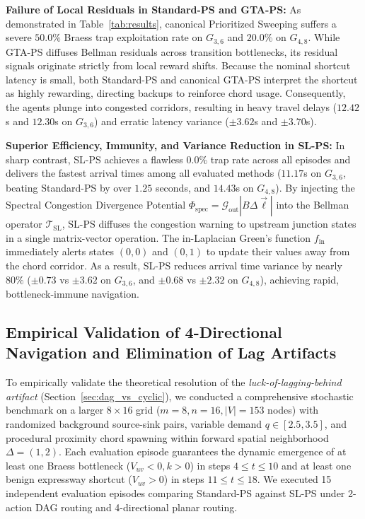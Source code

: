 \documentclass[11pt,a4paper]{article}
\begin{document}
\textbf{Failure of Local Residuals in Standard-PS and GTA-PS:}
As demonstrated in Table~\ref{tab:results}, canonical Prioritized Sweeping suffers a severe $50.0\%$ Braess trap exploitation rate on $G_{3,6}$ and $20.0\%$ on $G_{4,8}$. While GTA-PS diffuses Bellman residuals across transition bottlenecks, its residual signals originate strictly from local reward shifts. Because the nominal shortcut latency is small, both Standard-PS and canonical GTA-PS interpret the shortcut as highly rewarding, directing backups to reinforce chord usage. Consequently, the agents plunge into congested corridors, resulting in heavy travel delays ($12.42$s and $12.30$s on $G_{3,6}$) and erratic latency variance ($\pm 3.62$s and $\pm 3.70$s).

\textbf{Superior Efficiency, Immunity, and Variance Reduction in SL-PS:}
In sharp contrast, SL-PS achieves a flawless $0.0\%$ trap rate across all episodes and delivers the fastest arrival times among all evaluated methods ($11.17$s on $G_{3,6}$, beating Standard-PS by over $1.25$ seconds, and $14.43$s on $G_{4,8}$). By injecting the Spectral Congestion Divergence Potential $\Phi_{\text{spec}} = \mathcal{G}_{\text{out}} |B \Delta \vec{\ell}|$ into the Bellman operator $\mathcal{T}_{\text{SL}}$, SL-PS diffuses the congestion warning to upstream junction states in a single matrix-vector operation. The in-Laplacian Green's function $f_{\text{in}}$ immediately alerts states $(0, 0)$ and $(0, 1)$ to update their values away from the chord corridor. As a result, SL-PS reduces arrival time variance by nearly $80\%$ ($\pm 0.73$ vs $\pm 3.62$ on $G_{3,6}$, and $\pm 0.68$ vs $\pm 2.32$ on $G_{4,8}$), achieving rapid, bottleneck-immune navigation.

\subsection{Empirical Validation of 4-Directional Navigation and Elimination of Lag Artifacts}
\label{sec:exp_4directional}

To empirically validate the theoretical resolution of the \textit{luck-of-lagging-behind artifact} (Section~\ref{sec:dag_vs_cyclic}), we conducted a comprehensive stochastic benchmark on a larger $8 \times 16$ grid ($m=8, n=16, |V|=153$ nodes) with randomized background source-sink pairs, variable demand $q \in [2.5, 3.5]$, and procedural proximity chord spawning within forward spatial neighborhood $\Delta = (1, 2)$. Each evaluation episode guarantees the dynamic emergence of at least one Braess bottleneck ($V_{uv} < 0, k > 0$) in steps $4 \le t \le 10$ and at least one benign expressway shortcut ($V_{uv} > 0$) in steps $11 \le t \le 18$. We executed 15 independent evaluation episodes comparing Standard-PS against SL-PS under 2-action DAG routing and 4-directional planar routing.
\end{document}
